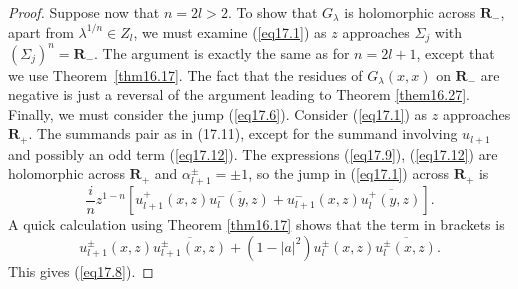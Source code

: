 \documentclass{surv-l}
\theoremstyle{plain}
\theoremstyle{definition}
\numberwithin{equation}{chapter}
\begin{document}
\begin{proof}
Suppose now that $n=2l>2$. To show that $G_{\lambda}$ is holomorphic across $\mathbf{R}_{-}$, apart from $\lambda^{1/n}\in Z_{l}$, we must examine (\ref{eq17.1}) as $z$ approaches $\Sigma_{j}$ with $(\Sigma_{j})^{n}=\mathbf{R}_{-}$. The argument is exactly the same as for $n=2l+1$, except that we use Theorem~\ref{thm16.17}. The fact that the residues of $G_{\lambda}(x, x)$ on $\mathbf{R}_{-}$ are negative is just a reversal of the argument leading to Theorem \ref{them16.27}. Finally, we must consider the jump (\ref{eq17.6}). Consider (\ref{eq17.1}) as $z$ approaches $ \mathbf{R}_{+}$. The summands pair as in (17.11), except for the summand involving $u_{l+1}$ and possibly an odd term (\ref{eq17.12}). The expressions (\ref{eq17.9}), (\ref{eq17.12}) are holomorphic across $\mathbf{R}_{+}$ and $\alpha_{l+1}^{\pm}=\pm 1$, so the jump in (\ref{eq17.1}) across $\mathbf{R}_{+}$ is
\begin{equation}\label{eq17.14}
\frac{i}{n}z^{1-n}[u_{l+1}^{+}(x, z)\overline{u_{l}^{-}(y,z)}+u_{l+1}^{-}(x, z)\overline{u_{l}^{+}(y,z)}].
\end{equation}
A quick calculation using Theorem \ref{thm16.17} shows that the term in brackets is
\begin{equation}\label{eq17.15}
u_{l+1}^{\pm}(x, z)\overline{u_{l+1}^{\pm}(x,z)}+(1-|a|^{2})u_{l}^{\pm}(x, z)\overline{u_{l}^{\pm}(x,z)}.
\end{equation}
This gives (\ref{eq17.8}).
\end{proof}
\setcounter{theorem}{15}
\end{document}
